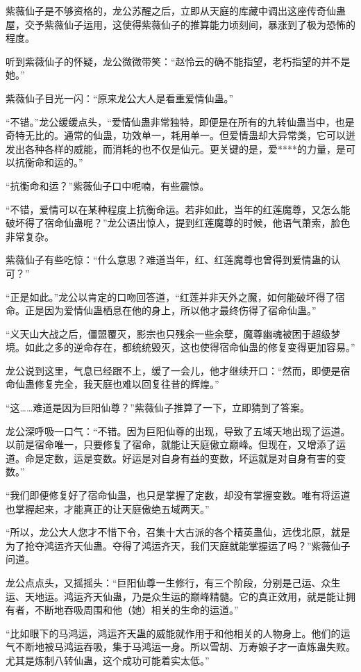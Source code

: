 \begin{this_body}
紫薇仙子是不够资格的，龙公苏醒之后，立即从天庭的库藏中调出这座传奇仙蛊屋，交予紫薇仙子运用，这使得紫薇仙子的推算能力顷刻间，暴涨到了极为恐怖的程度。

听到紫薇仙子的怀疑，龙公微微带笑：“赵怜云的确不能指望，老朽指望的并不是她。”

紫薇仙子目光一闪：“原来龙公大人是看重爱情仙蛊。”

“不错。”龙公缓缓点头，“爱情仙蛊非常独特，即便是在所有的九转仙蛊当中，也是奇特无比的。通常的仙蛊，功效单一，耗用单一。但爱情蛊却大异常类，它可以迸发出各种各样的威能，而消耗的也不仅是仙元。更关键的是，爱****的力量，是可以抗衡命和运的。”

“抗衡命和运？”紫薇仙子口中呢喃，有些震惊。

“不错，爱情可以在某种程度上抗衡命运。若非如此，当年的红莲魔尊，又怎么能破坏得了宿命仙蛊呢？”龙公语出惊人，提到红莲魔尊的时候，他语气萧索，脸色非常复杂。

紫薇仙子有些吃惊：“什么意思？难道当年，红、红莲魔尊也曾得到爱情蛊的认可？”

“正是如此。”龙公以肯定的口吻回答道，“红莲并非天外之魔，如何能破坏得了宿命。正是因为爱情仙蛊栖息在他的身上，所以他才最终伤得了宿命仙蛊。”

“义天山大战之后，僵盟覆灭，影宗也只残余一些余孽，魔尊幽魂被困于超级梦境。如此之多的逆命存在，都统统毁灭，这也使得宿命仙蛊的修复变得更加容易。”

龙公说到这里，气息已经跟不上，缓了一会儿，他才继续开口：“然而，即便是宿命仙蛊修复完全，我天庭也难以回复往昔的辉煌。”

“这……难道是因为巨阳仙尊？”紫薇仙子推算了一下，立即猜到了答案。

龙公深呼吸一口气：“不错。因为巨阳仙尊的出现，导致了五域天地出现了运道。以前是宿命唯一，只要修复了宿命，就能让天庭傲立巅峰。但现在，又增添了运道。命是定数，运是变数。好运是对自身有益的变数，坏运就是对自身有害的变数。”

“我们即便修复好了宿命仙蛊，也只是掌握了定数，却没有掌握变数。唯有将运道也掌握起来，才能真正的让天庭傲绝五域两天。”

“所以，龙公大人您才不惜下令，召集十大古派的各个精英蛊仙，远伐北原，就是为了抢夺鸿运齐天仙蛊。夺得了鸿运齐天，我们天庭就能掌握运了吗？”紫薇仙子问道。

龙公点点头，又摇摇头：“巨阳仙尊一生修行，有三个阶段，分别是己运、众生运、天地运。鸿运齐天仙蛊，乃是众生运的巅峰精髓。它的真正效用，就是能让拥有者，不断地吞吸周围和他（她）相关的生命的运道。”

“比如眼下的马鸿运，鸿运齐天蛊的威能就作用于和他相关的人物身上。他们的运气不断地被马鸿运吞吸，集于马鸿运一身。所以雪胡、万寿娘子才一直炼蛊失败。尤其是炼制八转仙蛊，这个成功可能着实太低。”


\end{this_body}
